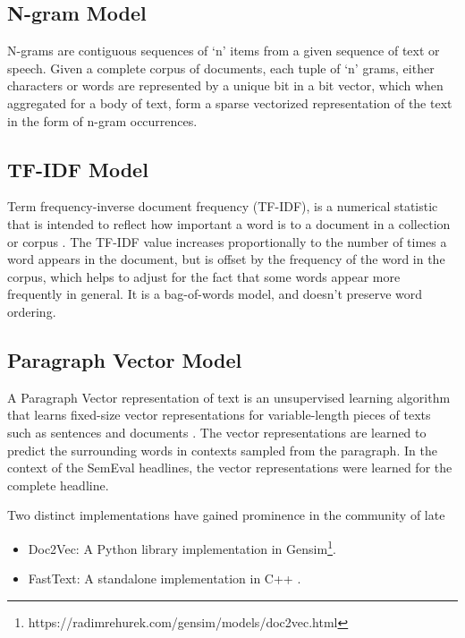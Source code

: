 \documentclass[11pt,a4paper]{article}
\begin{document}
  \subsection{N-gram Model} %
  \label{sub:n_gram_model}
    N-grams are contiguous sequences of `n' items from a given sequence of text or speech. Given a complete corpus of documents, each tuple of `n' grams, either characters or words are represented by a unique bit in a bit vector, which when aggregated for a body of text, form a sparse vectorized representation of the text in the form of n-gram occurrences.
  

  \subsection{TF-IDF Model} %
  \label{sub:tf_idf_model}
    Term frequency-inverse document frequency (TF-IDF), is a numerical statistic that is intended to reflect how important a word is to a document in a collection or corpus \cite{sparck1972statistical}. The TF-IDF value increases proportionally to the number of times a word appears in the document, but is offset by the frequency of the word in the corpus, which helps to adjust for the fact that some words appear more frequently in general. It is a bag-of-words model, and doesn't preserve word ordering.
  

  \subsection{Paragraph Vector Model} %
  \label{sub:paragraph_vectors_doc2vec}

    A Paragraph Vector representation of text is an unsupervised learning algorithm that learns fixed-size vector representations for variable-length pieces of texts such as sentences and documents \cite{le2014distributed}. The vector representations are learned to predict the surrounding words in contexts sampled from the paragraph. In the context of the SemEval headlines, the vector representations were learned for the complete headline.

    Two distinct implementations have gained prominence in the community of late
    \begin{itemize}
      \item 
        Doc2Vec: A Python library implementation in Gensim\footnote{https://radimrehurek.com/gensim/models/doc2vec.html}.
      \item 
        FastText: A standalone implementation in C++ \cite{bojanowski2016enriching} \cite{joulin2016bag}.
    \end{itemize}
  
\end{document}
